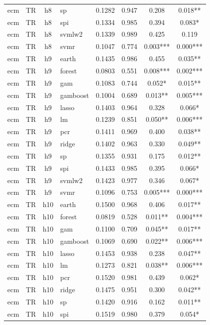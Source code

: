 \begin{ThreePartTable}
\begin{longtable}[t]{llclcccc}
ecm & TR & h8 & sp & 0.1282 & 0.947 & 0.208 & 0.018**\\
ecm & TR & h8 & spi & 0.1334 & 0.985 & 0.394 & 0.083*\\
ecm & TR & h8 & svmlw2 & 0.1339 & 0.989 & 0.425 & 0.119\\
ecm & TR & h8 & svmr & 0.1047 & 0.774 & 0.003*** & 0.000***\\
\addlinespace
ecm & TR & h9 & earth & 0.1435 & 0.986 & 0.455 & 0.035**\\
ecm & TR & h9 & forest & 0.0803 & 0.551 & 0.008*** & 0.002***\\
ecm & TR & h9 & gam & 0.1083 & 0.744 & 0.052* & 0.015**\\
ecm & TR & h9 & gamboost & 0.1004 & 0.689 & 0.013** & 0.005***\\
ecm & TR & h9 & lasso & 0.1403 & 0.964 & 0.328 & 0.066*\\
ecm & TR & h9 & lm & 0.1239 & 0.851 & 0.050** & 0.006***\\
ecm & TR & h9 & pcr & 0.1411 & 0.969 & 0.400 & 0.038**\\
ecm & TR & h9 & ridge & 0.1402 & 0.963 & 0.330 & 0.049**\\
ecm & TR & h9 & sp & 0.1355 & 0.931 & 0.175 & 0.012**\\
ecm & TR & h9 & spi & 0.1433 & 0.985 & 0.395 & 0.066*\\
ecm & TR & h9 & svmlw2 & 0.1423 & 0.977 & 0.346 & 0.067*\\
ecm & TR & h9 & svmr & 0.1096 & 0.753 & 0.005*** & 0.000***\\
\addlinespace
ecm & TR & h10 & earth & 0.1500 & 0.968 & 0.406 & 0.017**\\
ecm & TR & h10 & forest & 0.0819 & 0.528 & 0.011** & 0.004***\\
ecm & TR & h10 & gam & 0.1100 & 0.709 & 0.045** & 0.017**\\
ecm & TR & h10 & gamboost & 0.1069 & 0.690 & 0.022** & 0.006***\\
ecm & TR & h10 & lasso & 0.1453 & 0.938 & 0.238 & 0.047**\\
ecm & TR & h10 & lm & 0.1273 & 0.821 & 0.038** & 0.006***\\
ecm & TR & h10 & pcr & 0.1520 & 0.981 & 0.439 & 0.062*\\
ecm & TR & h10 & ridge & 0.1475 & 0.951 & 0.300 & 0.042**\\
ecm & TR & h10 & sp & 0.1420 & 0.916 & 0.162 & 0.011**\\
ecm & TR & h10 & spi & 0.1519 & 0.980 & 0.379 & 0.054*\\

\end{longtable}
\end{ThreePartTable}
